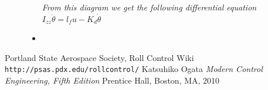 \documentclass[12pt]{article}
\begin{document}
\begin{description}
\begin{itemize}
				\textit{From this diagram we get the following differential equation}\\
				\textit{$I_{zz}\ddot{\theta} = l_{f}u - K_{d}\dot{\theta}$} \cite{PSAS} \\
			
			\item[]

				
		\end{itemize}
		
\end{description}
 
\newpage
 \begin{thebibliography}{9}
 Portland State Aerospace Society, Roll Control Wiki
 \texttt{http://psas.pdx.edu/rollcontrol/}
 Katsuhiko Ogata
 \textit{Modern Control Engineering, Fifth Edition}
 Prentice Hall, Boston, MA, 2010
 \end{thebibliography}
\end{document}
